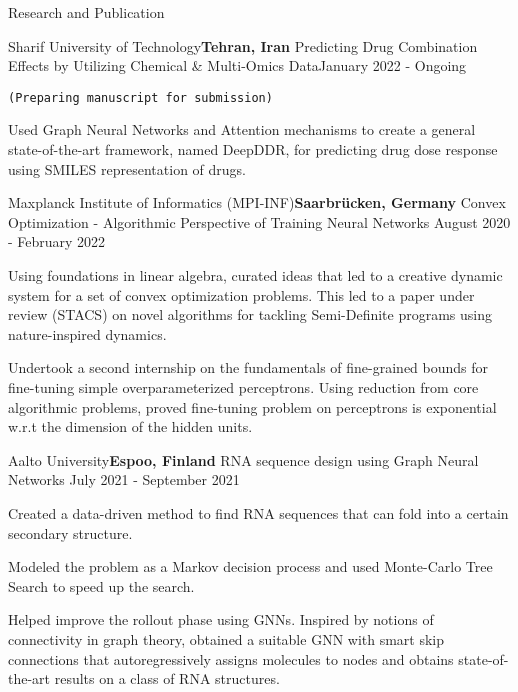 \documentclass{resume} %
\begin{document}
\begin{rSection}{Research and Publication}


\begin{rSubsection}{Sharif University of Technology}{\textcolor{Black!70}{\bf Tehran, Iran}}
{Predicting Drug Combination Effects by Utilizing Chemical \& Multi-Omics Data}{\textcolor{Black!70}{January 2022 - Ongoing}}
\item {\tt (Preparing manuscript for submission)}
\begin{small}
\item Used Graph Neural Networks and Attention mechanisms to create a general state-of-the-art framework, named DeepDDR, for predicting drug dose response using SMILES representation of drugs.
\end{small}
\end{rSubsection}

\begin{rSubsection}{Maxplanck Institute of Informatics (MPI-INF)}{\textcolor{Black!70}{\bf Saarbrücken, Germany}}
{Convex Optimization - Algorithmic Perspective of Training Neural Networks}
{\textcolor{Black!70}{August 2020 - February 2022}}
\begin{small}
\item Using foundations in linear algebra, curated ideas that led to a creative dynamic system for a set of convex optimization problems. This led to a paper under review (STACS) on novel algorithms for tackling Semi-Definite programs using nature-inspired dynamics.
\item Undertook a second internship on the fundamentals of fine-grained bounds for fine-tuning simple overparameterized perceptrons. Using reduction from core algorithmic problems, proved fine-tuning problem on perceptrons is exponential w.r.t the dimension of the hidden units.
\end{small}
\end{rSubsection}

\begin{rSubsection}{Aalto University}{\textcolor{Black!70}{\bf Espoo, Finland}}
{RNA sequence design using Graph Neural Networks}
{\textcolor{Black!70}{July 2021 - September 2021}}{}
\begin{small}
\item Created a data-driven method to find RNA sequences that can fold into a certain secondary structure.
\item Modeled the problem as a Markov decision process and used Monte-Carlo Tree Search to speed up the search.
\item Helped improve the rollout phase using GNNs. Inspired by notions of connectivity in graph theory, obtained a suitable GNN with smart skip connections that autoregressively assigns molecules to nodes and obtains state-of-the-art results on a class of RNA structures.
\end{small}
\end{rSubsection}

\end{rSection}
\end{document}
